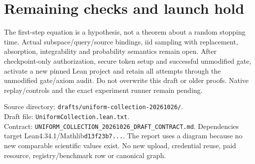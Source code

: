 \documentclass[10pt]{article}
\begin{document}
\section*{Remaining checks and launch hold}
The first-step equation is a hypothesis, not a theorem about a random stopping
time. Actual subspace/query/source bindings, iid sampling with replacement,
absorption, integrability and probability semantics remain open. After
checkpoint-only authorization, secure token setup and successful unmodified
gate, activate a new pinned Lean project and retain all attempts through the
unmodified gate/axiom audit. Do not overwrite this draft or older proofs.
Native replay/controls and the exact experiment runner remain pending.

Source directory: \texttt{drafts/uniform-collection-20261026/}.\\
Draft file: \texttt{UniformCollection.lean.txt}.\\
Contract: \texttt{UNIFORM\_COLLECTION\_20261026\_DRAFT\_CONTRACT.md}.
Dependencies target Lean4.34.1/Mathlib\texttt{d13f23b7...}. The report uses a
diagram because no new comparable scientific values exist. No new upload,
credential reuse, paid resource, registry/benchmark row or canonical graph.
\end{document}
